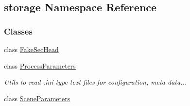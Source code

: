 \hypertarget{namespacestorage}{\subsection{storage Namespace Reference}
\label{namespacestorage}
}
\subsubsection*{Classes}
\begin{DoxyCompactItemize}
\item 
class \hyperlink{classstorage_1_1FakeSecHead}{Fake\-Sec\-Head}
\item 
class \hyperlink{classstorage_1_1ProcessParameters}{Process\-Parameters}
\begin{DoxyCompactList}\small\item\em Utils to read .ini type text files for configuration, meta data... \end{DoxyCompactList}\item 
class \hyperlink{classstorage_1_1SceneParameters}{Scene\-Parameters}
\end{DoxyCompactItemize}
